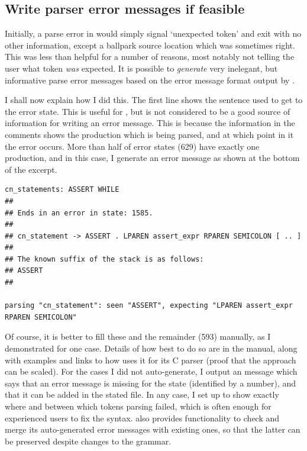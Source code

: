 \subsection{Write parser error messages if feasible}

Initially, a parse error in  would simply signal `unexpected token' and
exit with no other information, except a ballpark source location which was
sometimes right. This was less than helpful for a number of reasons, most
notably not telling the user what token \emph{was} expected. It is possible to
\emph{generate} very inelegant, but informative parse error messages based on
the error message format output by
.

I shall now explain how I did
this. The first line shows the sentence used to get to the error state.
This is useful for , but is not considered to be a good source of
information for writing an error message. This is because the information in
the comments shows the production which is being parsed, and at which point in
it the error occurs. More than half of error states (629) have exactly one
production, and in this case, I generate an error message as shown at the
bottom of the excerpt.

\begin{verbatim}
cn_statements: ASSERT WHILE
##
## Ends in an error in state: 1585.
##
## cn_statement -> ASSERT . LPAREN assert_expr RPAREN SEMICOLON [ .. ]
##
## The known suffix of the stack is as follows:
## ASSERT
##

parsing "cn_statement": seen "ASSERT", expecting "LPAREN assert_expr RPAREN SEMICOLON"
\end{verbatim}

Of course, it is better to fill these and the remainder (593) manually, as I
demonstrated for one
case.
Details of how best to do so are in the  manual, along with
examples and links to how  uses it for its C parser (proof that
the approach can be scaled). For the cases I did not auto-generate, I
output an message which says that an error message is missing for the state
(identified by a number), and that it can be added in the stated file. In any
case, I set up  to show exactly where and between which tokens
parsing failed, which is often enough for experienced users to fix the syntax.
 also provides functionality to check and merge its auto-generated
error messages with existing ones, so that the latter can be preserved despite
changes to the grammar.


